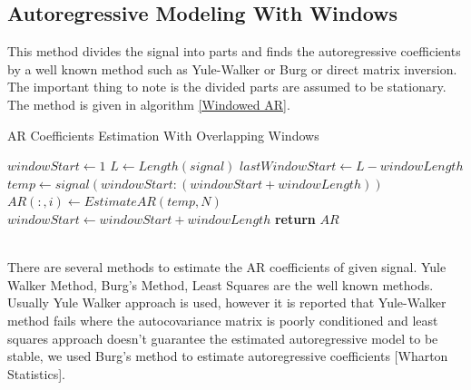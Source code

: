 \documentclass[a4paper,onesided,12pt]{report}
\begin{document}
\subsection{Autoregressive Modeling With Windows}
This method divides the signal into parts and finds the autoregressive coefficients by a well known method such as Yule-Walker or Burg or direct matrix inversion. The important thing to note is the divided parts are assumed to be stationary. The method is given in algorithm \ref{Windowed AR}.
\begin{algorithm}
	\caption{AR Coefficients Estimation With Overlapping Windows}
	\label{Windowed AR}
	\begin{algorithmic}[1]
			\State $windowStart \gets 1$
			\State $L \gets Length(signal)$
			\State $lastWindowStart \gets {L-windowLength}$
				\State $temp \gets signal(windowStart:(windowStart+windowLength))$
				\State $AR(:,i) \gets EstimateAR(temp, N)$
				\State $windowStart \gets windowStart + windowLength$
			\EndWhile
		\State \textbf{return} $AR$
		\EndProcedure
	\end{algorithmic}
\end{algorithm}\\
\newline
There are several methods to estimate the AR coefficients of given signal. Yule Walker Method, Burg's Method, Least Squares are the well known methods. Usually Yule Walker approach is used, however it is reported that Yule-Walker method fails where the autocovariance matrix is poorly conditioned and least squares approach doesn't guarantee the estimated autoregressive model to be stable, we used Burg's method to estimate autoregressive coefficients [Wharton Statistics].
\end{document}
